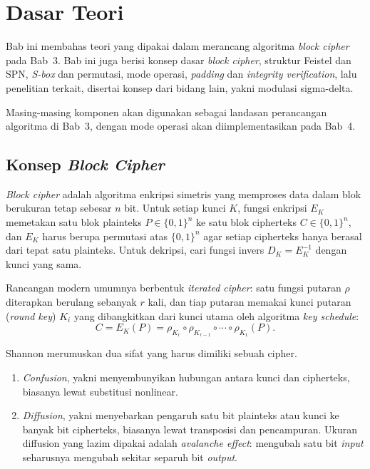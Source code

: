 \section{Dasar Teori}
Bab ini membahas teori yang dipakai dalam merancang algoritma \textit{block cipher} pada Bab~3.
Bab ini juga berisi konsep dasar \textit{block cipher}, struktur Feistel dan SPN, \textit{S-box} dan
permutasi, mode operasi, \textit{padding} dan \textit{integrity verification},
lalu penelitian terkait, disertai konsep dari bidang lain, yakni modulasi sigma-delta.

Masing-masing komponen akan digunakan sebagai landasan perancangan algoritma di Bab~3, dengan
mode operasi akan diimplementasikan pada Bab~4.

\subsection{Konsep \textit{Block Cipher}}
\textit{Block cipher} adalah algoritma enkripsi simetris yang memproses data dalam blok berukuran
tetap sebesar $n$ bit. Untuk setiap kunci $K$, fungsi enkripsi $E_K$ memetakan satu blok plainteks
$P \in \{0,1\}^n$ ke satu blok cipherteks $C \in \{0,1\}^n$, dan $E_K$ harus berupa permutasi atas
$\{0,1\}^n$ agar setiap cipherteks hanya berasal dari tepat satu plainteks. Untuk dekripsi, cari
fungsi invers $D_K = E_K^{-1}$ dengan kunci yang sama.

Rancangan modern umumnya berbentuk \textit{iterated cipher}: satu fungsi putaran $\rho$ diterapkan
berulang sebanyak $r$ kali, dan tiap putaran memakai kunci putaran (\textit{round key}) $K_i$ yang
dibangkitkan dari kunci utama oleh algoritma \textit{key schedule}:
\begin{equation}
  C = E_K(P) = \rho_{K_r} \circ \rho_{K_{r-1}} \circ \cdots \circ \rho_{K_1}(P).
\end{equation}

Shannon \cite{shannon} merumuskan dua sifat yang harus dimiliki sebuah cipher. 
\begin{enumerate}
    \item \textit{Confusion}, yakni menyembunyikan hubungan antara kunci dan cipherteks, biasanya lewat substitusi nonlinear.
    \item \textit{Diffusion}, yakni menyebarkan pengaruh satu bit plainteks atau kunci ke banyak bit cipherteks,
biasanya lewat transposisi dan pencampuran. Ukuran diffusion yang lazim dipakai adalah
\textit{avalanche effect}: mengubah satu bit \textit{input} seharusnya mengubah sekitar separuh bit
\textit{output}.
\end{enumerate}


